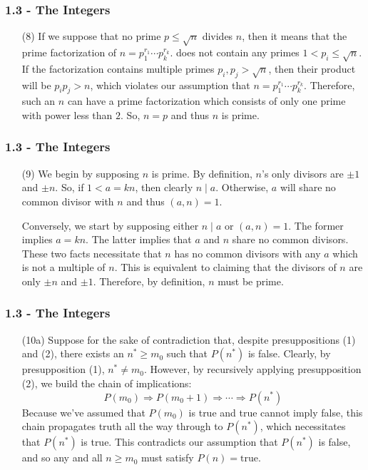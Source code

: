 \documentclass{beamer}
\begin{document}
\begin{frame}
\frametitle{1.3 - The Integers}
\small
\begin{enumerate}
	\item[(8)] If we suppose that no prime $p\leq\sqrt{n}$ divides $n$, then it means that the prime factorization of $n=p_1^{r_1}\cdots p_k^{r_k}$. does not contain any primes $1 < p_i \leq \sqrt{n}$. If the factorization contains multiple primes $p_i,p_j > \sqrt{n}$, then their product will be $p_i p_j > n$, which violates our assumption that $n=p_1^{r_1}\cdots p_k^{r_k}$. Therefore, such an $n$ can have a prime factorization which consists of only one prime with power less than $2$. So, $n = p$ and thus $n$ is prime.
\end{enumerate}
\end{frame}
\begin{frame}
\frametitle{1.3 - The Integers}
\small
\begin{enumerate}
	\item[(9)] \quad We begin by supposing $n$ is prime. By definition, $n$'s only divisors are $\pm 1$ and $\pm n$. So, if $1 < a = kn$, then clearly $n\mid a$. Otherwise, $a$ will share no common divisor with $n$ and thus $(a,n) = 1$.
	
	\quad Conversely, we start by supposing either $n\mid a$ or $(a,n) = 1$. The former implies $a = kn$. The latter implies that $a$ and $n$ share no common divisors. These two facts necessitate that $n$ has no common divisors with any $a$ which is not a multiple of $n$. This is equivalent to claiming that the divisors of $n$ are only $\pm n$ and $\pm 1$. Therefore, by definition, $n$ must be prime.
\end{enumerate}
\end{frame}
\begin{frame}
\frametitle{1.3 - The Integers}
\small
\begin{enumerate}
	\item[(10a)] Suppose for the sake of contradiction that, despite presuppositions (1) and (2), there exists an $n^* \geq m_0$ such that $P(n^*)$ is false. Clearly, by presupposition (1), $n^*\neq m_0$. However, by recursively applying presupposition (2), we build the chain of implications:
	\begin{equation*}
	P(m_0)\Rightarrow P(m_0 + 1)\Rightarrow\cdots\Rightarrow P(n^*)
	\end{equation*}
	Because we've assumed that $P(m_0)$ is true and true cannot imply false, this chain propagates truth all the way through to $P(n^*)$, which necessitates that $P(n^*)$ is true. This contradicts our assumption that $P(n^*)$ is false, and so any and all $n\geq m_0$ must satisfy $P(n)=\text{true}$.
\end{enumerate}
\end{frame}
\end{document}
